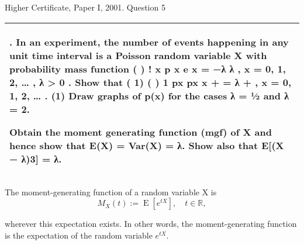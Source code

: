 \documentclass[a4paper,12pt]{article}
\begin{document}
Higher Certificate, Paper I, 2001. Question 5
\begin{table}[ht!]
 \centering
 \begin{tabular}{|p{15cm}|}
 \hline
\noindent 5. In an experiment, the number of events happening in any unit time interval is a
Poisson random variable X with probability mass function
( ) !
x
p x e
x
= −λ λ , x = 0, 1, 2, … , λ > 0 .
Show that
( 1) ( )
1
px px
x
+ = λ
+
, x = 0, 1, 2, … .
(1)
Draw graphs of p(x) for the cases λ = ½ and λ = 2.

Obtain the moment generating function (mgf) of X and hence show that
E(X) = Var(X) = λ. Show also that E[(X − λ)3] = λ.
\\ \hline
  \end{tabular}
\end{table}

\begin{framed}
\noindent The moment-generating function of a random variable X is 
\[{\displaystyle M_{X}(t):=\operatorname{E} \left[e^{tX}\right],\quad t\in \mathbb{R} ,} \]

\noindent wherever this expectation exists. In other words, the moment-generating function is the expectation of the random variable 
${\displaystyle e^{tX}}. $
\end{framed}
\end{document}
